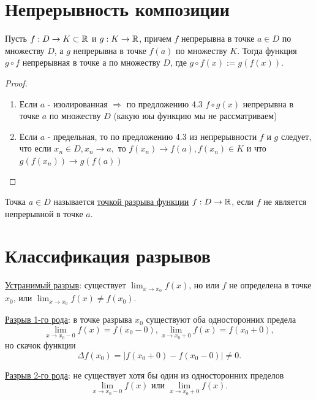 	\section{Непрерывность композиции}
	
	\begin{sentence}
		Пусть $f : D \rightarrow K \subset \mathbb R$ и $g : K \rightarrow \mathbb R$, причем $f$ непрерывна в точке $a \in D$ по множеству $D$, а $g$ непрерывна в точке $f(a)$ по
		множеству $K$. Тогда функция $g \circ f$ непрерывная в точке $а$ по множеству $D$, где $g \circ f(x) := g(f(x))$.
	\end{sentence}
	
	\begin{proof}
		\begin{enumerate}
			\item Если $a$ - изолированная $\Rightarrow$ по предложению 4.3 $f \circ g(x)$ непрерывна в точке $a$ по множеству $D$ (какую юы функцию мы не рассматриваем)
			\item Если $a$ - предельная, то по предложению 4.3 из непрерывности $f$ и $g$ следует, что если $x_n \in D, x_n \to a,$ то $f(x_n) \to f(a), f(x_n) \in K$ и что $g(f(x_n)) \to g(f(a))$
		\end{enumerate}
	\end{proof}
	
	\begin{definition}
		Точка $a \in D$ называется \underline{точкой разрыва функции} $f : D \rightarrow \mathbb R$, если $f$ не является непрерывной в точке $a$.
	\end{definition}
	
	\section{Классификация разрывов}
	
	\begin{definition}
		\underline{Устранимый разрыв}: существует $\lim_{x \to x_0} f(x)$, но или $f$ не определена в точке $x_0$, или $\lim_{x \to x_0} f(x) \neq f(x_0)$.
		
		\underline{Разрыв 1-го рода}: в точке разрыва $x_0$ существуют оба односторонних предела
		\[ \lim_{x \to x_0 - 0} f(x) = f(x_0 - 0), \lim_{x \to x_0 + 0} f(x) = f(x_0 + 0), \]		
		но скачок функции
		\[ \Delta f(x_0) = |f(x_0 + 0) - f(x_0 - 0)| \neq 0. \]
		
		\underline{Разрыв 2-го рода}: не существует хотя бы один из односторонних пределов
		\[ \lim_{x \to x_0 - 0} f(x) \text{ или } \lim_{x \to x_0 + 0} f(x). \]
	\end{definition}
	
